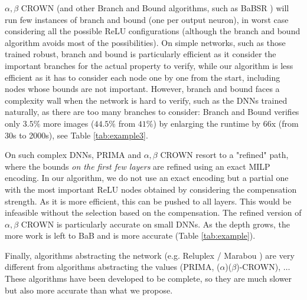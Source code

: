 $\alpha,\beta$ CROWN \cite{crown} (and other Branch and Bound algorithms, such as BaBSR \cite{BaB}) will run few instances of branch and bound (one per output neuron), in worst case considering all the possible ReLU configurations (although the branch and bound algorithm avoids most of the possibilities). On simple networks, such as those trained robust, branch and bound is  particularly efficient as it consider the important branches for the actual property to verify, while our algorithm is less efficient as it has to consider each node one by one from the start, including nodes whose bounds are not important. However, branch and bound faces a complexity wall when the network is hard to verify, such as the DNNs trained naturally, as there are too many branches to consider: Branch and Bound verifies only $3.5\%$ more images ($44.5\%$ from $41\%$) by enlarging the runtime by 66x (from 30s to 2000s), see Table \ref{tab:example3}.

On such complex DNNs, PRIMA and $\alpha,\beta$ CROWN resort to a "refined" path, where the bounds {\em on the first few layers} are refined \cite{MILP2} using an exact MILP encoding. In our algorithm, we do not use an exact encoding but a partial one with the most important ReLU nodes obtained by considering the compensation strength. As it is more efficient, this can be pushed to all layers. This would be infeasible without the selection based on the compensation. The refined version of $\alpha,\beta$ CROWN is particularly accurate on small DNNs. As the depth grows, the more work is left to BaB and \CMP is more accurate (Table \ref{tab:example}).

Finally, algorithms abstracting the network (e.g. Reluplex / Marabou \cite{Reluplex,katz2019marabou}) are very different from algorithms abstracting the values (PRIMA, ($\alpha$)($\beta$)-CROWN)\cite{prima,crown}, \CMP $\ldots$ These algorithms have been developed to be complete, so they are much slower but also more accurate than what we propose.
